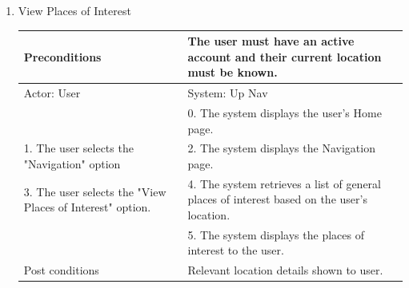 \documentclass{article}
\begin{document}
\begin{enumerate}
\begin{center}
\begin{enumerate}
\begin{enumerate}
	\item{View Places of Interest}
	\begin{table}[H]
	\centering
		\begin{tabular}{ | p{15em} | p{15em}| }
		\hline
		Preconditions                                             				& The user must have an active account and their current location must be known. \\ 
		\hline
		Actor: User                                              				& System: Up Nav \\
		 \hline
                                                          							& 0. The system displays the user's Home page. \\
		\hline
		1. The user selects the "Navigation" option				& 2. The system displays the Navigation page. \\
		\hline
		3. The user selects the "View Places of Interest" option. 		& 4. The system retrieves a list of general places of interest based on the user's location. \\ 
		\hline
                                                          							& 5. The system displays the places of interest to the user. \\ 
		\hline
		Post conditions								& Relevant location details shown to user. \\
		\hline
		\end{tabular}
	\end{table}


\end{enumerate}
\end{enumerate}
\end{center}
\end{enumerate}
\end{document}
